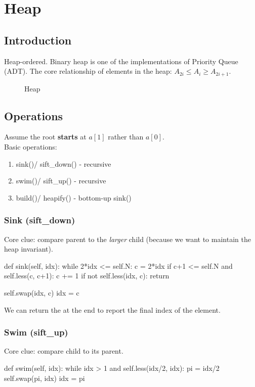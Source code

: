 \chapter{Heap}

\section{Introduction}
Heap-ordered. Binary heap is one of the implementations of Priority Queue (ADT). The core relationship of elements in the heap:
$A_{2i} \leq A_{i} \geq A_{2i+1}$.


\begin{figure}[hbtp]
\centering
{}
\caption{Heap}
\label{fig:heap}
\end{figure}
\section{Operations}
Assume the root \textbf{starts} at $a[1]$ rather than $a[0]$.
\\
Basic operations:
\begin{enumerate}
\item sink()/ sift\_down() - recursive
\item swim()/ sift\_up() - recursive
\item build()/ heapify() - bottom-up sink()
\end{enumerate}
\subsection{Sink (sift\_down)}
Core clue: compare parent to the \textit{larger} child (because we want to maintain the heap invariant). 
\begin{python}
def sink(self, idx):
    while 2*idx <= self.N:
        c = 2*idx
        if c+1 <= self.N and self.less(c, c+1):
            c += 1
        if not self.less(idx, c):
            return 

        self.swap(idx, c)
        idx = c
\end{python}
We can return the  at the end to report the final index of the element. 
\subsection{Swim (sift\_up)}
Core clue: compare child to its parent. 
\begin{python}
def swim(self, idx):
    while idx > 1 and self.less(idx/2, idx):
        pi = idx/2
        self.swap(pi, idx)
        idx = pi
\end{python}
